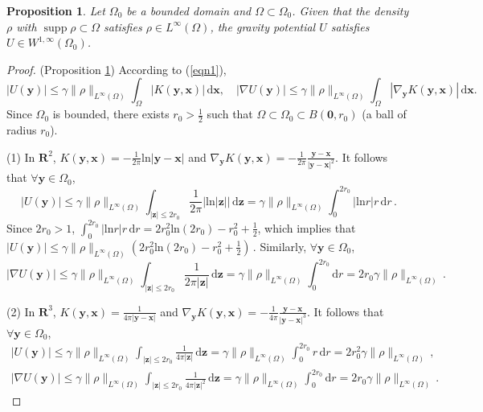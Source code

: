 \documentclass[10pt,a4paper]{amsart}
\newtheorem{proposition}{Proposition}
\begin{document}
\begin{proposition} \label{prop5}
Let $\Omega_0$ be a bounded domain and $\Omega\subset\Omega_0$. Given that the density $\rho$ with $\operatorname{supp}\rho\subset\Omega$ satisfies $\rho\in L^\infty(\Omega)$, the gravity potential $U$ satisfies $U\in W^{1,\infty}(\Omega_0)$.
\end{proposition}

\begin{proof}
(Proposition \ref{prop5}) According to (\ref{eqn1}),
\[
|U(\mathbf{y})| \leq \gamma \|\rho\|_{L^\infty(\Omega)} \int_\Omega |K(\mathbf{y}, \mathbf{x})| \, \mathrm{d}\mathbf{x},\quad  |\nabla U(\mathbf{y})| \leq \gamma \|\rho\|_{L^\infty(\Omega)} \int_\Omega |\nabla_{\mathbf{y}}K(\mathbf{y}, \mathbf{x})| \, \mathrm{d}\mathbf{x}.
\]
Since $\Omega_0$ is bounded, there exists $r_0>\frac{1}{2}$ such that $\Omega\subset\Omega_0\subset B(\mathbf{0}, r_0)$ (a ball of radius $r_0$).

(1) In $\mathbf{R}^2$, $K(\mathbf{y},\mathbf{x})=-\frac{1}{2\pi}\mathrm{ln}|\mathbf{y}-\mathbf{x}|$ and $\nabla_{\mathbf{y}}K(\mathbf{y}, \mathbf{x})=-\frac{1}{2\pi}\frac{\mathbf{y}-\mathbf{x}}{|\mathbf{y}-\mathbf{x}|^2}$. It follows that $\forall\mathbf{y}\in\Omega_0$,
\[
|U(\mathbf{y})| \leq \gamma \|\rho\|_{L^\infty(\Omega)} \int_{|\mathbf{z}| \le 2 r_0} \frac{1}{2\pi}\big|\mathrm{ln}|\mathbf{z}|\big| \, \mathrm{d}\mathbf{z} = \gamma \|\rho\|_{L^\infty(\Omega)} \int_0^{2 r_0}|\mathrm{ln}r|r\,\mathrm{d}r\,.
\]
Since $2 r_0>1$, $\int_0^{2 r_0}|\mathrm{ln}r|r\,\mathrm{d}r=2r_0^2\mathrm{ln}(2r_0)-r_0^2+\frac{1}{2}$, which implies that
$
|U(\mathbf{y})| \leq \gamma \|\rho\|_{L^\infty(\Omega)}\left(2 r_0^2\mathrm{ln}(2 r_0)-r_0^2+\frac{1}{2}\right)\,.
$
Similarly, $\forall\mathbf{y}\in\Omega_0$,
\[
 |\nabla U(\mathbf{y})| \leq \gamma \|\rho\|_{L^\infty(\Omega)} \int_{|\mathbf{z}| \le 2 r_0}\frac{1}{2\pi |\mathbf{z}|} \, \mathrm{d}\mathbf{z}=\gamma \|\rho\|_{L^\infty(\Omega)} \int_0^{2 r_0}\mathrm{d}r=2r_0\gamma\|\rho\|_{L^\infty(\Omega)}\,.
\]

(2) In $\mathbf{R}^3$, $K(\mathbf{y},\mathbf{x})=\frac{1}{4\pi|\mathbf{y}-\mathbf{x}|}$ and $\nabla_{\mathbf{y}}K(\mathbf{y}, \mathbf{x})=-\frac{1}{4\pi}\frac{\mathbf{y}-\mathbf{x}}{|\mathbf{y}-\mathbf{x}|^3}$. It follows that $\forall\mathbf{y}\in\Omega_0$,
\begin{align*}
|U(\mathbf{y})| \leq \gamma \|\rho\|_{L^\infty(\Omega)} \int_{|\mathbf{z}| \le 2 r_0} \frac{1}{4\pi |\mathbf{z}|}\, \mathrm{d}\mathbf{z} = \gamma \|\rho\|_{L^\infty(\Omega)} \int_0^{2r_0}r\,\mathrm{d}r=2r_0^2 \gamma \|\rho\|_{L^\infty(\Omega)}\,, \\
|\nabla U(\mathbf{y})| \leq \gamma \|\rho\|_{L^\infty(\Omega)} \int_{|\mathbf{z}| \le 2r_0} \frac{1}{4\pi |\mathbf{z}|^2}\, \mathrm{d}\mathbf{z} = \gamma \|\rho\|_{L^\infty(\Omega)} \int_0^{2r_0} \mathrm{d}r=2r_0 \gamma \|\rho\|_{L^\infty(\Omega)}\,. 
\end{align*}
\end{proof}
\end{document}
